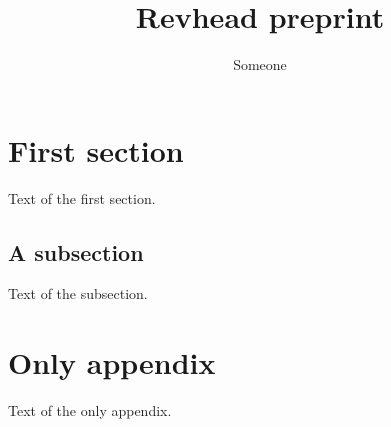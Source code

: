\documentclass[aip,jcp,preprint]{revtex4-2}
\begin{document}
\title{Revhead preprint}
\author{Someone}
\maketitle
\section{First section}
Text of the first section.
\subsection{A subsection}
Text of the subsection.
\appendix*
\section{Only appendix}
Text of the only appendix.

\end{document}
